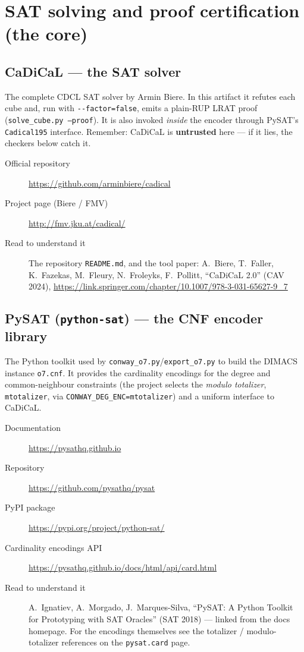 \documentclass[11pt]{article}
\newcommand{\tool}[1]{\subsection{#1}}
\begin{document}
\section{SAT solving and proof certification (the core)}

\tool{CaDiCaL --- the SAT solver}
The complete CDCL SAT solver by Armin Biere. In this artifact it refutes each
cube and, run with \texttt{-{}-factor=false}, emits a plain-RUP LRAT proof
(\texttt{solve\_cube.py --proof}). It is also invoked \emph{inside} the encoder
through PySAT's \texttt{Cadical195} interface. Remember: CaDiCaL is
\textbf{untrusted} here --- if it lies, the checkers below catch it.
\begin{description}
  \item[Official repository] \url{https://github.com/arminbiere/cadical}
  \item[Project page (Biere / FMV)] \url{http://fmv.jku.at/cadical/}
  \item[Read to understand it] The repository \texttt{README.md}, and the tool
        paper: A.\ Biere, T.\ Faller, K.\ Fazekas, M.\ Fleury, N.\ Froleyks,
        F.\ Pollitt, ``CaDiCaL 2.0'' (CAV 2024),
        \url{https://link.springer.com/chapter/10.1007/978-3-031-65627-9_7}
\end{description}

\tool{PySAT (\texttt{python-sat}) --- the CNF encoder library}
The Python toolkit used by \texttt{conway\_o7.py}/\texttt{export\_o7.py} to build
the DIMACS instance \texttt{o7.cnf}. It provides the cardinality encodings for
the degree and common-neighbour constraints (the project selects the
\emph{modulo totalizer}, \texttt{mtotalizer}, via
\texttt{CONWAY\_DEG\_ENC=mtotalizer}) and a uniform interface to CaDiCaL.
\begin{description}
  \item[Documentation] \url{https://pysathq.github.io}
  \item[Repository] \url{https://github.com/pysathq/pysat}
  \item[PyPI package] \url{https://pypi.org/project/python-sat/}
  \item[Cardinality encodings API] \url{https://pysathq.github.io/docs/html/api/card.html}
  \item[Read to understand it] A.\ Ignatiev, A.\ Morgado, J.\ Marques-Silva,
        ``PySAT: A Python Toolkit for Prototyping with SAT Oracles'' (SAT 2018) ---
        linked from the docs homepage. For the encodings themselves see the
        totalizer / modulo-totalizer references on the \texttt{pysat.card} page.
\end{description}
\end{document}
